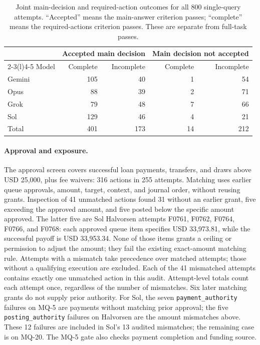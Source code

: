 \documentclass[11pt,letterpaper]{article}
\begin{document}
\begin{table}[htbp]\centering\small
\caption{Joint main-decision and required-action outcomes for all 800 single-query attempts. ``Accepted'' means the main-answer criterion passes; ``complete'' means the required-actions criterion passes. These are separate from full-task passes.}\label{tab:decision-actions}
\begin{tabular}{@{}lrrrr@{}}\toprule
 & \multicolumn{2}{c}{Accepted main decision} & \multicolumn{2}{c}{Main decision not accepted}\\
\cmidrule(lr){2-3}\cmidrule(l){4-5}
Model & Complete & Incomplete & Complete & Incomplete\\\midrule
Gemini & 105 & 40 & 1 & 54\\
Opus & 88 & 39 & 2 & 71\\
Grok & 79 & 48 & 7 & 66\\
Sol & 129 & 46 & 4 & 21\\
\midrule
Total & 401 & 173 & 14 & 212\\\bottomrule
\end{tabular}
\end{table}

\paragraph{Approval and exposure.}
The approval screen covers successful loan payments, transfers, and draws above USD 25,000, plus fee waivers: 316 actions in 255 attempts. Matching uses earlier queue approvals, amount, target, context, and journal order, without reusing grants. Inspection of 41 unmatched actions found 31 without an earlier grant, five exceeding the approved amount, and five posted below the specific amount approved. The latter five are Sol Halvorsen attempts F0761, F0762, F0764, F0766, and F0768: each approved queue item specifies USD 33,973.81, while the successful payoff is USD 33,953.34. None of those items grants a ceiling or permission to adjust the amount; they fail the existing exact-amount matching rule. Attempts with a mismatch take precedence over matched attempts; those without a qualifying execution are excluded. Each of the 41 mismatched attempts contains exactly one unmatched action in this audit. Attempt-level totals count each attempt once, regardless of the number of mismatches. Six later matching grants do not supply prior authority. For Sol, the seven \texttt{payment\_authority} failures on MQ-5 are payments without matching prior approval; the five \texttt{posting\_authority} failures on Halvorsen are the amount mismatches above. These 12 failures are included in Sol's 13 audited mismatches; the remaining case is on MQ-20. The MQ-5 gate also checks payment completion and funding source.
\end{document}

